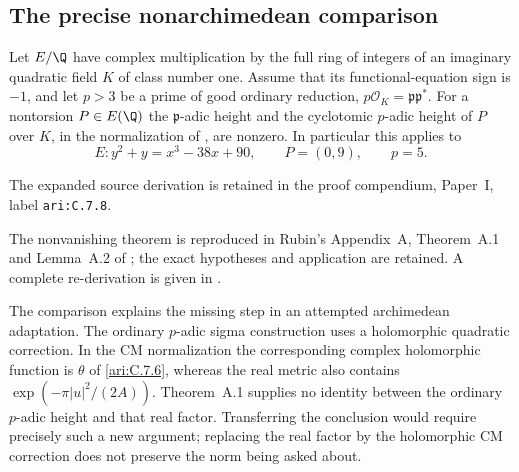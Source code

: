 \subsection{The precise nonarchimedean comparison}
\begin{cited}\hypertarget{tag-001H}{}\label{ari:C.7.8}

Let $E/\Q$ have complex multiplication by the full ring of integers
of an imaginary quadratic field $K$ of class number one. Assume
that its functional-equation sign is $-1$, and let $p>3$ be a
prime of good ordinary reduction, $p\mathcal O_K=\mathfrak p
\mathfrak p^*$. For a nontorsion $P\in E(\Q)$ the
$\mathfrak p$-adic height and the cyclotomic $p$-adic height
of $P$ over $K$, in the normalization of
\citet[Appendix A]{agboola2006}, are nonzero.
In particular this applies to
\[
 E:y^2+y=x^3-38x+90,\qquad P=(0,9),\qquad p=5.
\]
\end{cited}
The expanded source derivation is retained in the proof compendium, Paper~I, label \nolinkurl{ari:C.7.8}.




The nonvanishing theorem is reproduced in Rubin's Appendix~A, Theorem~A.1 and Lemma~A.2 of \citet{agboola2006}; the exact hypotheses and application are retained. A complete re-derivation is given in .


The comparison explains the missing step in an attempted
archimedean adaptation. The ordinary $p$-adic sigma construction
uses a holomorphic quadratic correction. In the CM normalization
the corresponding complex holomorphic function is $\theta$
of \ref{ari:C.7.6}, whereas the real metric also contains
$\exp(-\pi|u|^2/(2A))$. Theorem~A.1 supplies no identity
between the ordinary $p$-adic height and that real factor.
Transferring the conclusion would require precisely such a
new argument; replacing the real factor by the holomorphic
CM correction does not preserve the norm being asked about.


